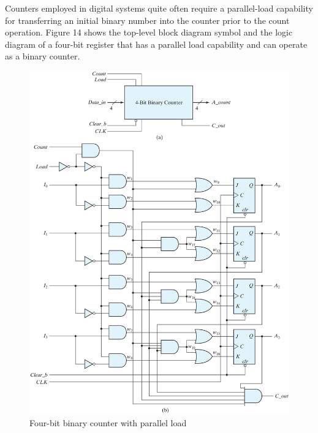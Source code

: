 Counters employed in digital systems quite often require a parallel-load capability for transferring an initial binary number into the counter prior to the count operation. Figure 14 shows the top-level block diagram symbol and the logic diagram of a four-bit register that has a parallel load capability and can operate as a binary counter.

\begin{figure}[H]
  \centering
  \includegraphics[width=.95\linewidth]{img/fig-6.14.png}
  \caption{Four-bit binary counter with parallel load}
  \label{fig:6.14}
\end{figure}

